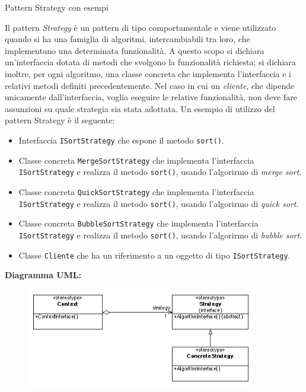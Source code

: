 \begin{problem}{1.19}
Pattern Strategy con esempi
\end{problem}
\begin{solution}
Il pattern \textit{Strategy} è un pattern di tipo comportamentale e viene utilizzato quando si ha una famiglia di algoritmi, intercambiabili tra loro, che implementano una determinata funzionalità.
A questo scopo si dichiara un'interfaccia dotata di metodi che svolgono la funzionalità richiesta; si dichiara inoltre, per ogni algoritmo, una classe concreta che implementa l'interfaccia e i relativi metodi definiti precedentemente.
\newline
Nel caso in cui un \textit{cliente}, che dipende unicamente dall'interfaccia, voglia eseguire le relative funzionalità, non deve fare assunzioni su quale strategia sia stata adottata.
\newline
Un esempio di utilizzo del pattern Strategy è il seguente:
\begin{itemize}
	\item Interfaccia \texttt{ISortStrategy} che espone il metodo \texttt{sort()}.
	\item Classe concreta \texttt{MergeSortStrategy} che implementa l'interfaccia \texttt{ISortStrategy} e realizza il metodo \texttt{sort()}, usando l'algorirmo di \textit{merge sort}.
	\item Classe concreta \texttt{QuickSortStrategy} che implementa l'interfaccia \texttt{ISortStrategy} e realizza il metodo \texttt{sort()}, usando l'algorirmo di \textit{quick sort}.
	\item Classe concreta \texttt{BubbleSortStrategy} che implementa l'interfaccia \texttt{ISortStrategy} e realizza il metodo \texttt{sort()}, usando l'algorirmo di \textit{bubble sort}.
	\item Classe \texttt{Cliente} che ha un riferimento a un oggetto di tipo \texttt{ISortStrategy}.
\end{itemize}
\textbf{Diagramma UML:}
\begin{figure}[htb!]
	\centering
	\label{StrategyPattern}
	\includegraphics[width=10cm]{./immagini/strategyPattern.png}
\end{figure}
\end{solution}


